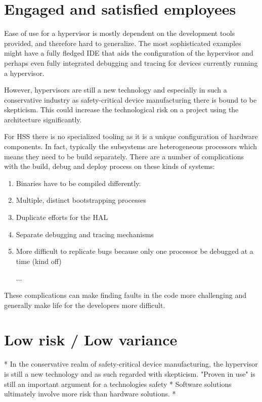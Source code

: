 
\section{Engaged and satisfied employees}
Ease of use for a hypervisor is mostly dependent on the development tools provided, and therefore hard to generalize. The most sophisticated examples might have a fully fledged \gls{IDE} that aids the configuration of the hypervisor and perhaps even fully integrated debugging and tracing for devices currently running a hypervisor. %

However, hypervisors are still a new technology and especially in such a conservative industry as safety-critical device manufacturing there is bound to be skepticism. This could increase the technological risk on a project using the architecture significantly.

For \gls{HSS} there is no specialized tooling as it is a unique configuration of hardware components. In fact, typically the subsystems are heterogeneous processors which means they need to be build separately. There are a number of complications with the build, debug and deploy process on these kinds of systems:
\begin{enumerate}
\item Binaries have to be compiled differently.
\item Multiple, distinct bootstrapping processes
\item Duplicate efforts for the \gls{HAL} %
\item Separate debugging and tracing mechanisms %
\item More difficult to replicate bugs because only one processor be debugged at a time (kind off)
\item [...]
\end{enumerate}
These complications can make finding faults in the code more challenging and generally make life for the developers more difficult.


\section{Low risk / Low variance}
* In the conservative realm of safety-critical device manufacturing, the hypervisor is still a new technology and as such regarded with skepticism. "Proven in use" is still an important argument for a technologies safety
* Software solutions ultimately involve more risk than hardware solutions.
* 

